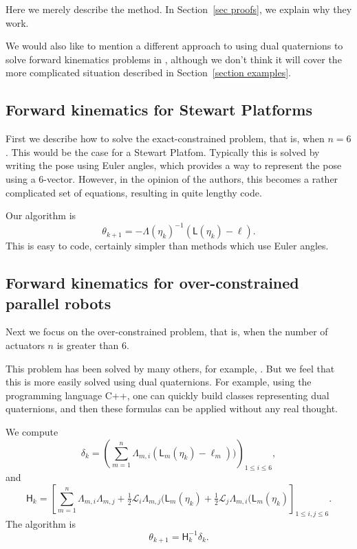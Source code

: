 \documentclass[reqno,12pt]{amsart}
\begin{document}
Here we merely describe the method.  In Section~\ref{sec proofs}, we explain why they work.

We would also like to mention a different approach to using dual quaternions to solve forward kinematics problems in \cite{yang-et-al}, although we don't think it will cover the more complicated situation described in Section~\ref{section examples}.

\subsection{Forward kinematics for Stewart Platforms}
\label{forward kinematics stewart}

First we describe how to solve the exact-constrained problem, that is, when $n= 6$.  This would be the case for a Stewart Platfom.  Typically this is solved by writing the pose using Euler angles, which provides a way to represent the pose using a 6-vector.  However, in the opinion of the authors, this becomes a rather complicated set of equations, resulting in quite lengthy code.

Our algorithm is
\begin{equation}
\label{exact constrained Newton-Raphson}
\theta_{k+1} = - \mathsf \Lambda(\eta_k)^{-1} (\mathsf L(\eta_k) - \bm\ell) .
\end{equation}
This is easy to code, certainly simpler than methods which use Euler angles.

\subsection{Forward kinematics for over-constrained parallel robots}
\label{forward kinematics}

Next we focus on the over-constrained problem, that is, when the number of actuators $n$ is greater than $6$.

This problem has been solved by many others, for example, \cite{pott-schmidt,yang-et-al}.  But we feel that this is more easily solved using dual quaternions.  For example, using the programming language C++, one can quickly build classes representing dual quaternions, and then these formulas can be applied without any real thought.

We compute
\begin{equation}
\delta_k = \left(\sum_{m=1}^n \mathsf \Lambda_{m,i} (\mathsf L_m(\eta_k) - \ell_m))\right)_{1 \le i \le 6},
\end{equation}
and
\begin{equation}
\mathsf H_k
= \left[\sum_{m=1}^n \mathsf\Lambda_{m,i} \mathsf\Lambda_{m,j} + \tfrac12 \mathcal L_i \mathsf \Lambda_{m,j} (\mathsf L_m(\eta_k) + \tfrac12 \mathcal L_j \mathsf \Lambda_{m,i} (\mathsf L_m(\eta_k)
\right]_{1\le i,j\le 6}.
\end{equation}
The algorithm is
\begin{equation}
\label{over constrained Newton-Raphson}
\theta_{k+1} =  \mathsf H_k^{-1} \delta_k .
\end{equation}
\end{document}

